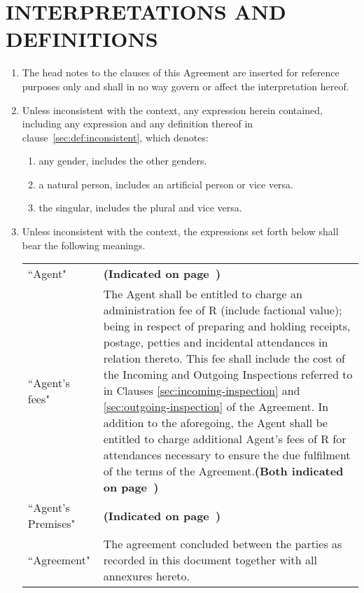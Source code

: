 \documentclass[11pt]{article}
\begin{document}
\section{\uppercase{Interpretations and Definitions}}
\begin{enumerate}
	\item The head notes to the clauses of this Agreement are inserted for reference purposes only and shall in no way govern or affect the interpretation hereof.
	\item Unless inconsistent with the context, any expression herein contained, including any expression and any definition thereof in clause~\ref{sec:def:inconsistent}, which denotes:
		\begin{enumerate}
			\item any gender, includes the other genders. 
			\item a natural person, includes an artificial person or vice versa.
			\item the singular, includes the plural and vice versa.
		\end{enumerate}
	\item Unless inconsistent with the context, the expressions set forth below shall bear the following meanings. \label{sec:def:inconsistent}
	\begin{table}[ht]
		\centering
		\begin{tabular}{p{4cm}p{13cm}}
	``Agent" & \textbf{(Indicated on page~\pageref{agent})} \\
	``Agent's fees" & The Agent shall be entitled to charge an administration fee of R\underline{\hspace{6em}} (include factional value); being in respect of preparing and holding receipts, postage, petties and incidental attendances in relation thereto. This fee shall include the cost of the Incoming and Outgoing Inspections referred to in Clauses \ref{sec:incoming-inspection} and \ref{sec:outgoing-inspection} of the Agreement. In addition to the aforegoing, the Agent shall be entitled to charge additional Agent's fees of R\underline{\hspace{6em}} for attendances necessary to ensure the due fulfilment of the terms of the Agreement.\textbf{(Both indicated on page~\pageref{sec:agreement})} \\
	``Agent's Premises" & \textbf{(Indicated on page~\pageref{input:premises})}\\
	``Agreement" & The agreement concluded between the parties as recorded in this document together with all annexures hereto. \\

\end{tabular}
\end{table}
\end{enumerate}
\end{document}
